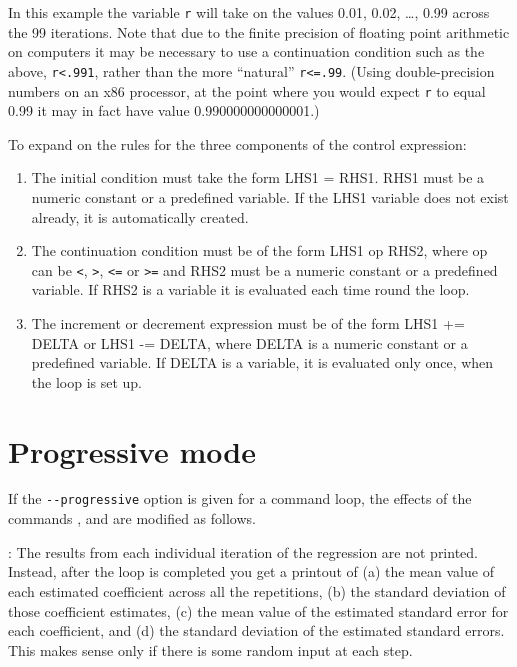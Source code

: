 
In this example the variable \verb+r+ will take on the values 0.01,
0.02, \dots{}, 0.99 across the 99 iterations.  Note that due to the
finite precision of floating point arithmetic on computers it may be
necessary to use a continuation condition such as the above,
\verb+r<.991+, rather than the more ``natural'' \verb+r<=.99+.  (Using
double-precision numbers on an x86 processor, at the point where you
would expect \verb+r+ to equal 0.99 it may in fact have value
0.990000000000001.)

To expand on the rules for the three components of the control
expression:

\begin{enumerate}
\item The initial condition must take the form LHS1 = RHS1.  RHS1 must
  be a numeric constant or a predefined variable.  If the LHS1
  variable does not exist already, it is automatically created.
\item The continuation condition must be of the form LHS1 op RHS2,
  where op can be \verb+<+, \verb+>+, \verb+<=+ or \verb+>=+ and RHS2
  must be a numeric constant or a predefined variable.  If RHS2 is a
  variable it is evaluated each time round the loop.
\item The increment or decrement expression must be of the form LHS1
  += DELTA or LHS1 -= DELTA, where DELTA is a numeric constant or a
  predefined variable.  If DELTA is a variable, it is evaluated only
  once, when the loop is set up.
\end{enumerate}
      

\section{Progressive mode}
\label{loop-progressive}

If the \verb+--progressive+ option is given for a command loop, the
effects of the commands ,  and  are
modified as follows.

: The results from each individual iteration of the
regression are not printed.  Instead, after the loop is completed you
get a printout of (a) the mean value of each estimated coefficient
across all the repetitions, (b) the standard deviation of those
coefficient estimates, (c) the mean value of the estimated standard
error for each coefficient, and (d) the standard deviation of the
estimated standard errors.  This makes sense only if there is some
random input at each step.

